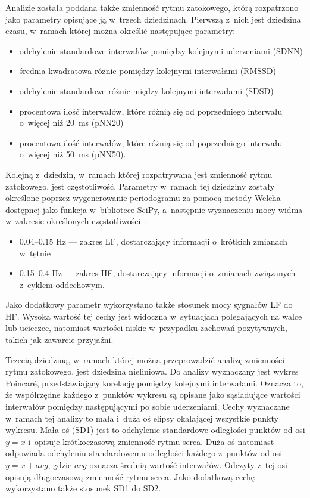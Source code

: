 Analizie została poddana także zmienność rytmu zatokowego, którą rozpatrzono jako parametry opisujące ją w~trzech dziedzinach. Pierwszą z~nich jest dziedzina czasu, w~ramach której można określić następujące parametry:
\begin{itemize}
	\item odchylenie standardowe interwałów pomiędzy kolejnymi uderzeniami (SDNN)
	\item średnia kwadratowa różnic pomiędzy kolejnymi interwałami (RMSSD)
	\item odchylenie standardowe różnic między kolejnymi interwałami (SDSD)
	\item procentowa ilość interwałów, które różnią się od poprzedniego interwału o~więcej niż 20~ms (pNN20)
	\item procentowa ilość interwałów, które różnią się od poprzedniego interwału o~więcej niż 50~ms (pNN50).
\end{itemize}
Kolejną z~dziedzin, w~ramach której rozpatrywana jest zmienność rytmu zatokowego, jest częstotliwość. 
Parametry w~ramach tej dziedziny zostały określone poprzez wygenerowanie periodogramu za pomocą metody Welcha~\cite{welch_1967} dostępnej jako funkcja w~bibliotece SciPy, a~następnie wyznaczeniu mocy widma w~zakresie określonych częstotliwości~\cite{hrv_overwiev_2017}:
\begin{itemize}
	\item 0.04--0.15 Hz --- zakres LF, dostarczający informacji o~krótkich zmianach w~tętnie
	\item 0.15--0.4 Hz --- zakres HF, dostarczający informacji o~zmianach związanych z~cyklem oddechowym.
\end{itemize}
Jako dodatkowy parametr wykorzystano także stosunek mocy sygnałów LF do HF. Wysoka wartość tej cechy jest widoczna w~sytuacjach polegających na walce lub ucieczce, natomiast wartości niskie w~przypadku zachowań pozytywnych, takich jak zawarcie przyjaźni.

Trzecią dziedziną, w~ramach której można przeprowadzić analizę zmienności rytmu zatokowego, jest dziedzina nieliniowa. Do analizy wyznaczany jest wykres Poincaré, przedstawiający korelację pomiędzy kolejnymi interwałami. Oznacza to, że współrzędne każdego z~punktów wykresu są opisane jako sąsiadujące wartości interwałów pomiędzy następującymi po sobie uderzeniami. Cechy wyznaczane w~ramach tej analizy to mała i~duża oś elipsy okalającej wszystkie punkty wykresu. Mała oś (SD1) jest to odchylenie standardowe odległości punktów od osi $y=x$ i~opisuje krótkoczasową zmienność rytmu serca. Duża oś natomiast odpowiada odchyleniu standardowemu odległości każdego z~punktów od osi $y=x+avg$, gdzie $avg$ oznacza średnią wartość interwałów. Odczyty z~tej osi opisują długoczasową zmienność rytmu serca. Jako dodatkową cechę wykorzystano także stosunek SD1 do SD2.

